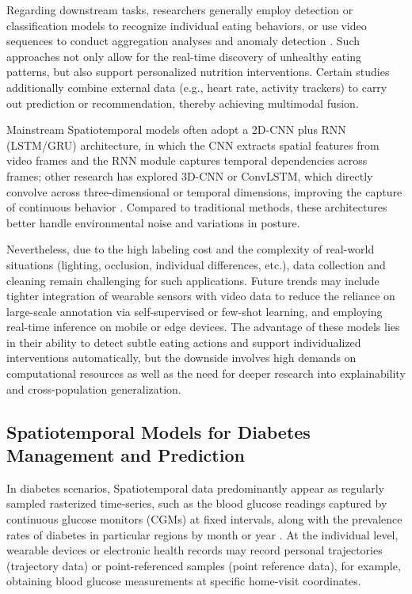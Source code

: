 \documentclass[acmsmall]{acmart}
\begin{document}
Regarding downstream tasks, researchers generally employ detection or classification models to recognize individual eating behaviors, or use video sequences to conduct aggregation analyses and anomaly detection \cite{9}. Such approaches not only allow for the real-time discovery of unhealthy eating patterns, but also support personalized nutrition interventions. Certain studies additionally combine external data (e.g., heart rate, activity trackers) to carry out prediction or recommendation, thereby achieving multimodal fusion.

Mainstream Spatiotemporal models often adopt a 2D-CNN plus RNN (LSTM/GRU) architecture, in which the CNN extracts spatial features from video frames and the RNN module captures temporal dependencies across frames; other research has explored 3D-CNN or ConvLSTM, which directly convolve across three-dimensional or temporal dimensions, improving the capture of continuous behavior \cite{9}. Compared to traditional methods, these architectures better handle environmental noise and variations in posture.

Nevertheless, due to the high labeling cost and the complexity of real-world situations (lighting, occlusion, individual differences, etc.), data collection and cleaning remain challenging for such applications. Future trends may include tighter integration of wearable sensors with video data to reduce the reliance on large-scale annotation via self-supervised or few-shot learning, and employing real-time inference on mobile or edge devices. The advantage of these models lies in their ability to detect subtle eating actions and support individualized interventions automatically, but the downside involves high demands on computational resources as well as the need for deeper research into explainability and cross-population generalization.

\subsection{Spatiotemporal Models for Diabetes Management and Prediction}
In diabetes scenarios, Spatiotemporal data predominantly appear as regularly sampled rasterized time-series, such as the blood glucose readings captured by continuous glucose monitors (CGMs) at fixed intervals, along with the prevalence rates of diabetes in particular regions by month or year \cite{3}. At the individual level, wearable devices or electronic health records may record personal trajectories (trajectory data) or point-referenced samples (point reference data), for example, obtaining blood glucose measurements at specific home-visit coordinates.
\end{document}
